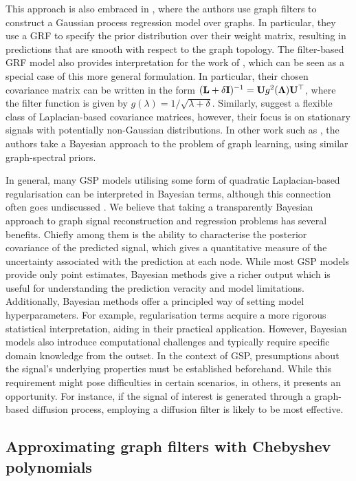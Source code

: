 This approach is also embraced in \cite{Venkitaraman2020}, where the authors use graph filters to construct a Gaussian process regression model over graphs. In particular, they use a GRF to specify the prior distribution over their weight matrix, resulting in predictions that are smooth with respect to the graph topology. The filter-based GRF model also provides interpretation for the work of \cite{Gadde2015}, which can be seen as a special case of this more general formulation. In particular, their chosen covariance matrix can be written in the form $(\mathbf{L} + \delta \mathbf{I})^{-1} = \mathbf{U} g^2(\mathbf{\Lambda}) \mathbf{U}^\top$, where the filter function is given by $g(\lambda) = 1 / \sqrt{\lambda + \delta}$. Similarly, \citep{Perraudin2017} suggest a flexible class of Laplacian-based covariance matrices, however, their focus is on stationary signals with potentially non-Gaussian distributions. In other work such as \cite{Dong2016}, the authors take a Bayesian approach to the problem of graph learning, using similar graph-spectral priors. 

In general, many GSP models utilising some form of quadratic Laplacian-based regularisation can be interpreted in Bayesian terms, although this connection often goes undiscussed \citep{Gribonval2011}. We believe that taking a transparently Bayesian approach to graph signal reconstruction and regression problems has several benefits. Chiefly among them is the ability to characterise the posterior covariance of the predicted signal, which gives a quantitative measure of the uncertainty associated with the prediction at each node. While most GSP models provide only point estimates, Bayesian methods give a richer output which is useful for understanding the prediction veracity and model limitations. Additionally, Bayesian methods offer a principled way of setting model hyperparameters. For example, regularisation terms acquire a more rigorous statistical interpretation, aiding in their practical application. However, Bayesian models also introduce computational challenges and typically require specific domain knowledge from the outset. In the context of GSP, presumptions about the signal's underlying properties must be established beforehand. While this requirement might pose difficulties in certain scenarios, in others, it presents an opportunity. For instance, if the signal of interest is generated through a graph-based diffusion process, employing a diffusion filter is likely to be most effective.


\subsection{Approximating graph filters with Chebyshev polynomials}

